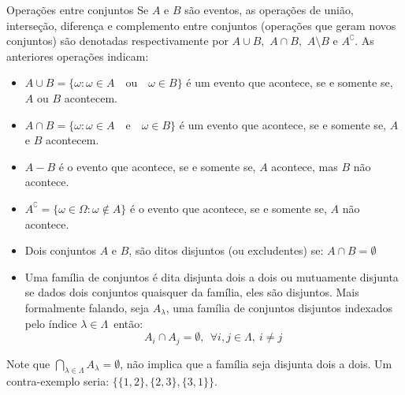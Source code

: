 \begin{frame}

\begin{block}{Operações entre conjuntos}
Se $A$ e $B$ são eventos, as operações de união, interseção, diferença e complemento entre conjuntos (operações que geram novos conjuntos) são denotadas respectivamente por $A \cup B,$   $A\cap B,$ $A \setminus B$ e $A^\complement.$ As anteriores operações indicam: 
\begin{itemize}
 \item $A\cup B = \{ \omega: \omega\in A \quad \text{ou} \quad \omega\in B\}$ é
um evento que acontece, se e somente se, $A$ ou $B$ acontecem.
\item $A\cap B =\{ \omega: \omega\in A \quad  \text{e} \quad \omega\in B\}$ é um
evento que acontece, se e somente se, $A$ e $B$ acontecem.
\item $A -  B$ é o evento que acontece, se e somente se, $A$ acontece, mas $B$ não acontece.
\item $A^\complement =\{ \omega\in \Omega: \omega\notin A\}$ é o evento que acontece, se e somente se, $A$ não acontece.

\item Dois conjuntos $A$ e $B$, são ditos disjuntos (ou excludentes) se: $A\cap B = \emptyset\,$
\item Uma família de conjuntos é dita disjunta dois a dois ou mutuamente disjunta se dados dois conjuntos quaisquer da família, eles são disjuntos. Mais formalmente falando, seja $A_\lambda $, uma família de conjuntos disjuntos indexados pelo índice $\lambda\in\Lambda\,$ então:
$$
A_i\cap A_j=\emptyset,~~\forall i,j\in\Lambda,~i\neq j\,
$$
\end{itemize}
\end{block}
Note que $ \bigcap_{\lambda\in\Lambda} A_\lambda=\emptyset$, não implica que a família seja disjunta dois a dois. Um contra-exemplo seria: $\{\{1, 2\}, \{2, 3\}, \{3, 1\}\}$.

\end{frame}

